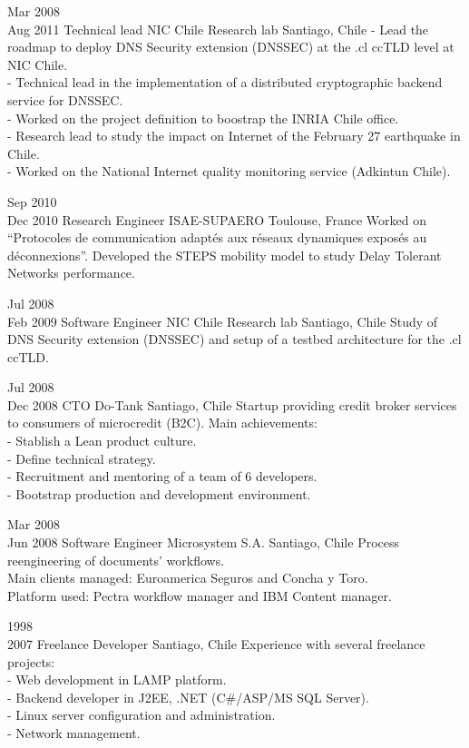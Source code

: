 \documentclass[10pt,a4paper,sans]{moderncv}
\begin{document}
\cventry
{Mar 2008\\Aug 2011}
{Technical lead}
{NIC Chile Research lab}
{Santiago, Chile}
{}
{
- Lead the roadmap to deploy DNS Security extension (DNSSEC) at the .cl ccTLD level at NIC Chile.\\
- Technical lead in the implementation of a distributed cryptographic backend service for DNSSEC.\\
- Worked on the project definition to boostrap the INRIA Chile office.\\
- Research lead to study the impact on Internet of the February 27 earthquake in Chile.\\
- Worked on the National Internet quality monitoring service (Adkintun Chile).
}

\cventry
{Sep 2010\\Dec 2010}
{Research Engineer}
{ISAE-SUPAERO}
{Toulouse, France}
{}
{
Worked on ``Protocoles de communication adaptés aux réseaux dynamiques exposés au déconnexions''. Developed the STEPS mobility model to study Delay Tolerant Networks performance.
}

\cventry
{Jul 2008\\Feb 2009}
{Software Engineer}
{NIC Chile Research lab}
{Santiago, Chile}
{}
{Study of DNS Security extension (DNSSEC) and setup of a testbed architecture for the .cl ccTLD.}

\cventry
{Jul 2008\\Dec 2008}
{CTO}
{Do-Tank}
{Santiago, Chile}
{}
{
Startup providing credit broker services to consumers of microcredit (B2C). Main achievements:\\
- Stablish a Lean product culture.\\
- Define technical strategy.\\
- Recruitment and mentoring of a team of 6 developers.\\
- Bootstrap production and development environment.\\
}

\cventry
{Mar 2008\\Jun 2008}
{Software Engineer}
{Microsystem S.A.}
{Santiago, Chile}
{}
{
Process reengineering of documents' workflows.\\
Main clients managed: Euroamerica Seguros and Concha y Toro. \\
Platform used: Pectra workflow manager and IBM Content manager.\\
}


\cventry
{1998\\2007}
{Freelance Developer}
{}
{Santiago, Chile}
{}
{
Experience with several freelance projects:\\
- Web development in LAMP platform.\\
- Backend developer in J2EE, .NET (C\#/ASP/MS SQL Server).\\
- Linux server configuration and administration.\\
- Network management.\\
}
\end{document}
